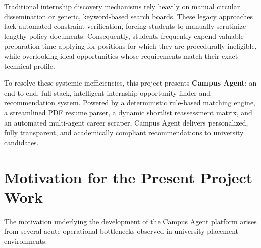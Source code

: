 Traditional internship discovery mechanisms rely heavily on manual circular dissemination or generic, keyword-based search boards. These legacy approaches lack automated constraint verification, forcing students to manually scrutinize lengthy policy documents. Consequently, students frequently expend valuable preparation time applying for positions for which they are procedurally ineligible, while overlooking ideal opportunities whose requirements match their exact technical profile. 

To resolve these systemic inefficiencies, this project presents \textbf{Campus Agent}: an end-to-end, full-stack, intelligent internship opportunity finder and recommendation system. Powered by a deterministic rule-based matching engine, a streamlined PDF resume parser, a dynamic shortlist reassessment matrix, and an automated multi-agent career scraper, Campus Agent delivers personalized, fully transparent, and academically compliant recommendations to university candidates.

\section{Motivation for the Present Project Work} \label{S1.2} 
The motivation underlying the development of the Campus Agent platform arises from several acute operational bottlenecks observed in university placement environments:


